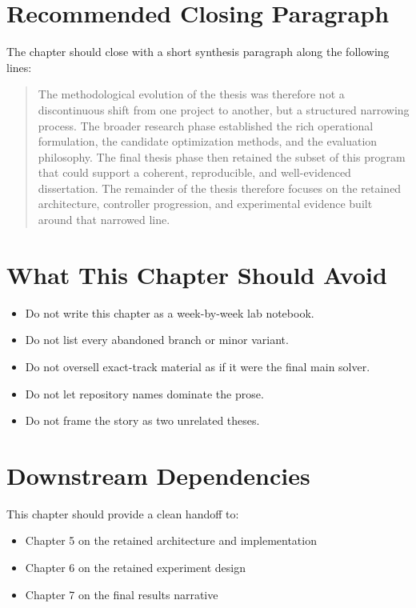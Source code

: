 \section{Recommended Closing Paragraph}
The chapter should close with a short synthesis paragraph along the following lines:

\begin{quote}
The methodological evolution of the thesis was therefore not a discontinuous shift from one project to another, but a structured narrowing process. The broader research phase established the rich operational formulation, the candidate optimization methods, and the evaluation philosophy. The final thesis phase then retained the subset of this program that could support a coherent, reproducible, and well-evidenced dissertation. The remainder of the thesis therefore focuses on the retained architecture, controller progression, and experimental evidence built around that narrowed line.
\end{quote}

\section{What This Chapter Should Avoid}
\begin{itemize}
    \item Do not write this chapter as a week-by-week lab notebook.
    \item Do not list every abandoned branch or minor variant.
    \item Do not oversell exact-track material as if it were the final main solver.
    \item Do not let repository names dominate the prose.
    \item Do not frame the story as two unrelated theses.
\end{itemize}

\section{Downstream Dependencies}
This chapter should provide a clean handoff to:
\begin{itemize}
    \item Chapter 5 on the retained architecture and implementation
    \item Chapter 6 on the retained experiment design
    \item Chapter 7 on the final results narrative
\end{itemize}

